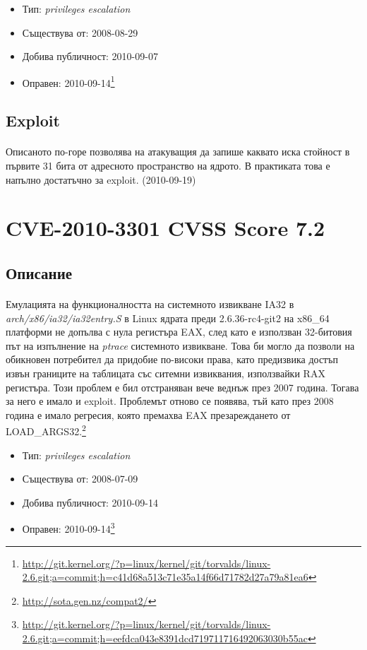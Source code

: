 \documentclass[a4paper,12pt,leqno]{article}
\begin{document}
\begin{itemize}
    \item Тип: \textit{privileges escalation}
    \item Съществува от: 2008-08-29
  	\item Добива публичност: 2010-09-07
    \item Оправен: 2010-09-14\footnote{\url{http://git.kernel.org/?p=linux/kernel/git/torvalds/linux-2.6.git;a=commit;h=c41d68a513c71e35a14f66d71782d27a79a81ea6}}
\end{itemize}

\subsection{Exploit}
\paragraph{}
Описаното по-горе позволява на атакуващия да запише каквато иска стойност в първите 31 бита от адресното пространство на ядрото. В практиката това е напълно достатъчно за exploit. (2010-09-19)

\section{CVE-2010-3301 CVSS Score 7.2}
\subsection{Описание}
\paragraph{}
Емулацията на функционалността на системното извикване IA32 в\\ \textit{arch/x86/ia32/ia32entry.S} в Linux ядрата преди 2.6.36-rc4-git2 на x86\_64 платформи не допълва с нула регистъра EAX, след като е използван 32-битовия път на изпълнение на \textit{ptrace} системното извикване. Това би могло да позволи на обикновен потребител да придобие по-високи права, като предизвика достъп извън границите на таблицата със ситемни извиквания, използвайки RAX регистъра. Този проблем е бил отстраняван вече веднъж през 2007 година. Тогава за него е имало и exploit. Проблемът отново се появява, тъй като през 2008 година е имало регресия, която премахва EAX презареждането от LOAD\_ARGS32.\footnote{\url{http://sota.gen.nz/compat2/}}

\begin{itemize}
    \item Тип: \textit{privileges escalation}
    \item Съществува от: 2008-07-09
  	\item Добива публичност: 2010-09-14
    \item Оправен: 2010-09-14\footnote{\url{http://git.kernel.org/?p=linux/kernel/git/torvalds/linux-2.6.git;a=commit;h=eefdca043e8391dcd719711716492063030b55ac}}
\end{itemize}
\end{document}
